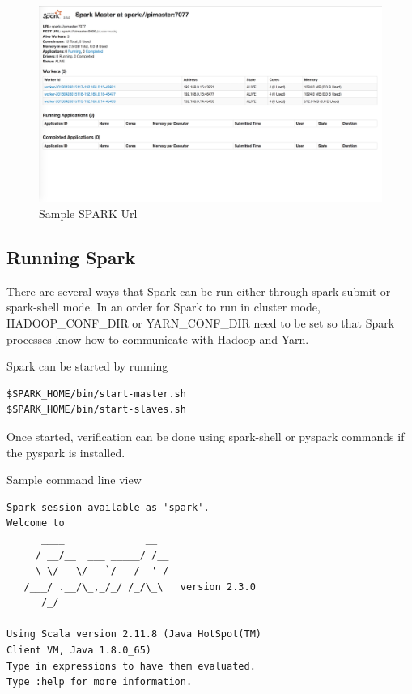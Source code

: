 \begin{figure}[htbp] 
	\centering
	\includegraphics[width=\columnwidth]{images/sparkurl.jpg}
	\caption{Sample SPARK Url}
\label{fig:sparkurl} 
\end{figure}

\subsection{Running Spark}
There are several ways that Spark can be run either through spark-submit or spark-shell mode. In an order for Spark to run in cluster mode, HADOOP\_CONF\_DIR or YARN\_CONF\_DIR need to be set so that Spark processes know how to communicate with Hadoop and Yarn. 

Spark can be started by running

\begin{verbatim}
$SPARK_HOME/bin/start-master.sh
$SPARK_HOME/bin/start-slaves.sh
\end{verbatim}

Once started, verification can be done using spark-shell or pyspark commands if the pyspark is installed.

Sample command line view

\begin{verbatim}
Spark session available as 'spark'.
Welcome to
      ____              __
     / __/__  ___ _____/ /__
    _\ \/ _ \/ _ `/ __/  '_/
   /___/ .__/\_,_/_/ /_/\_\   version 2.3.0
      /_/
         
Using Scala version 2.11.8 (Java HotSpot(TM) 
Client VM, Java 1.8.0_65)
Type in expressions to have them evaluated.
Type :help for more information.
\end{verbatim}

